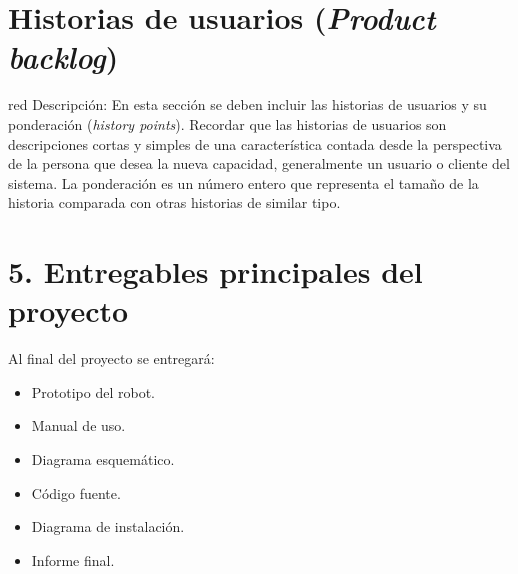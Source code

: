 \documentclass[11pt]{charter}
\begin{document}





\section{Historias de usuarios (\textit{Product backlog})}
\label{sec:backlog}

\begin{consigna}{red}
Descripción: En esta sección se deben incluir las historias de usuarios y su ponderación (\textit{history points}). Recordar que las historias de usuarios son descripciones cortas y simples de una característica contada desde la perspectiva de la persona que desea la nueva capacidad, generalmente un usuario o cliente del sistema. La ponderación es un número entero que representa el tamaño de la historia comparada con otras historias de similar tipo.
\end{consigna}

\vspace{40mm}


\section{5. Entregables principales del proyecto}
\label{sec:entregables}

Al final del proyecto se entregará: 
\begin{itemize}
\item Prototipo del robot.
\item Manual de uso.
\item Diagrama esquemático.
\item Código fuente.
\item Diagrama de instalación.
\item Informe final.

\end{itemize}
\end{document}
